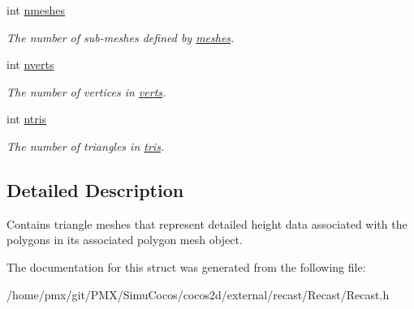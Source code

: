 \begin{DoxyCompactItemize}
\mbox{\label{structrcPolyMeshDetail_afbe7e21cf0f9dca429c6762f457f61b6}} 
int \hyperlink{structrcPolyMeshDetail_afbe7e21cf0f9dca429c6762f457f61b6}{nmeshes}
\begin{DoxyCompactList}\small\item\em The number of sub-\/meshes defined by \hyperlink{structrcPolyMeshDetail_af276db64c254f2ac9f6b7e8cac73a6e9}{meshes}. \end{DoxyCompactList}\item 
\mbox{\label{structrcPolyMeshDetail_a5424a45b24c43d49d93d89e89f11b59f}} 
int \hyperlink{structrcPolyMeshDetail_a5424a45b24c43d49d93d89e89f11b59f}{nverts}
\begin{DoxyCompactList}\small\item\em The number of vertices in \hyperlink{structrcPolyMeshDetail_acf351fccd62abd3efa10a97d396ced6d}{verts}. \end{DoxyCompactList}\item 
\mbox{\label{structrcPolyMeshDetail_a80041af5ae32e618d4980cd81a08c9e3}} 
int \hyperlink{structrcPolyMeshDetail_a80041af5ae32e618d4980cd81a08c9e3}{ntris}
\begin{DoxyCompactList}\small\item\em The number of triangles in \hyperlink{structrcPolyMeshDetail_af52b9bd3ee62a11898a1bdbc7851e7e3}{tris}. \end{DoxyCompactList}\end{DoxyCompactItemize}


\subsection{Detailed Description}
Contains triangle meshes that represent detailed height data associated with the polygons in its associated polygon mesh object. 

The documentation for this struct was generated from the following file\+:\begin{DoxyCompactItemize}
\item 
/home/pmx/git/\+P\+M\+X/\+Simu\+Cocos/cocos2d/external/recast/\+Recast/Recast.\+h\end{DoxyCompactItemize}
